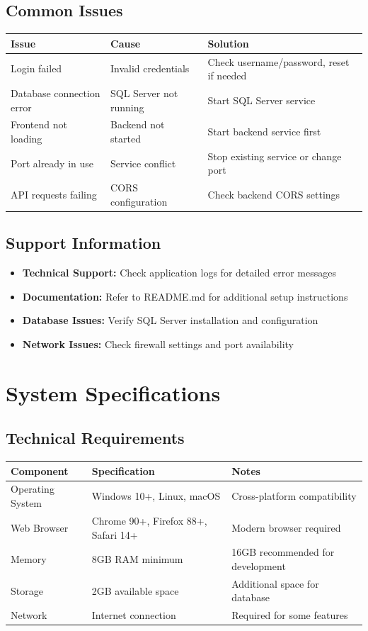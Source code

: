 \documentclass[12pt,a4paper]{article}
\begin{document}
\subsection{Common Issues}

\begin{longtable}{|p{4cm}|p{5cm}|p{5cm}|}
\hline
\textbf{Issue} & \textbf{Cause} & \textbf{Solution} \\
\hline
Login failed & Invalid credentials & Check username/password, reset if needed \\
\hline
Database connection error & SQL Server not running & Start SQL Server service \\
\hline
Frontend not loading & Backend not started & Start backend service first \\
\hline
Port already in use & Service conflict & Stop existing service or change port \\
\hline
API requests failing & CORS configuration & Check backend CORS settings \\
\hline
\end{longtable}

\subsection{Support Information}

\begin{itemize}
    \item \textbf{Technical Support:} Check application logs for detailed error messages
    \item \textbf{Documentation:} Refer to README.md for additional setup instructions
    \item \textbf{Database Issues:} Verify SQL Server installation and configuration
    \item \textbf{Network Issues:} Check firewall settings and port availability
\end{itemize}

\section{System Specifications}

\subsection{Technical Requirements}

\begin{longtable}{|p{3cm}|p{4cm}|p{7cm}|}
\hline
\textbf{Component} & \textbf{Specification} & \textbf{Notes} \\
\hline
Operating System & Windows 10+, Linux, macOS & Cross-platform compatibility \\
\hline
Web Browser & Chrome 90+, Firefox 88+, Safari 14+ & Modern browser required \\
\hline
Memory & 8GB RAM minimum & 16GB recommended for development \\
\hline
Storage & 2GB available space & Additional space for database \\
\hline
Network & Internet connection & Required for some features \\
\hline
\end{longtable}
\end{document}
